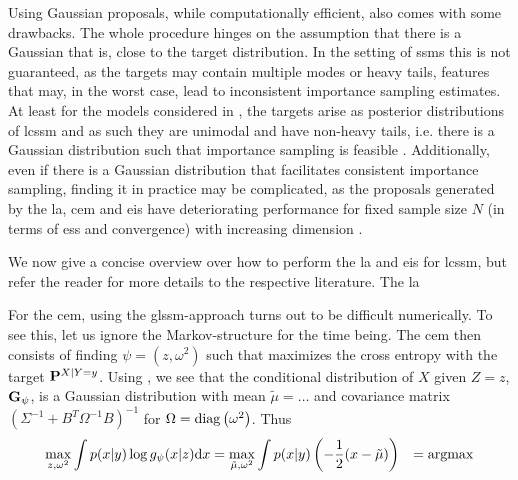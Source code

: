 Using Gaussian proposals, while computationally efficient, also comes with some drawbacks. The whole procedure hinges on the assumption that there is a Gaussian that is, close to the target distribution. In the setting of \glspl{ssm} this is not guaranteed, as the targets may contain multiple modes or heavy tails, features that may, in the worst case, lead to inconsistent importance sampling estimates. At least for the models considered in , the targets arise as posterior distributions of \gls{lcssm} and as such they are unimodal and have non-heavy tails, i.e. there is a Gaussian distribution such that importance sampling is feasible . 
Additionally, even if there is a Gaussian distribution that facilitates consistent importance sampling, finding it in practice may be complicated, as the proposals generated by the \gls{la}, \gls{cem} and \gls{eis} have deteriorating performance for fixed sample size $N$ (in terms of \gls{ess} and convergence) with increasing dimension .

We now give a concise overview over how to perform the \gls{la} and \gls{eis} for \gls{lcssm}, but refer the reader for more details to the respective literature.
The \gls{la} 


For the \gls{cem}, using the \gls{glssm}-approach turns out to be difficult numerically. To see this, let us ignore the Markov-structure for the time being. The \gls{cem} then consists of finding $\psi = (z, \omega^{2})$ such that  maximizes the cross entropy with the target $\P^{X|Y=y}$. Using , we see that the conditional distribution of $X$ given $Z=z$, $\G_{\psi}$, is a Gaussian distribution with mean $\tilde \mu = \dots$   and covariance matrix $ \left( \Sigma ^{-1} + B^{T}\Omega^{-1}B\right)^{-1}$ for $\Omega = \diag \left( \omega^{2} \right)$. Thus 
\begin{align*}
\max_{z, \omega^{2}} \int p(x|y) \log g_{\psi}(x|z) \mathrm dx &= \max_{\tilde\mu, \omega^{2}} \int p(x|y) \left( - \frac{1}{2} (x - \tilde \mu) \right)
&= \argmax_{}
\end{align*}

